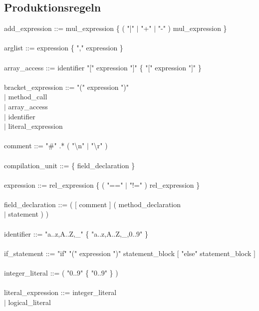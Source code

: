 \documentclass[10pt,a4paper,titlepage]{article}
\begin{document}
\subsection{Produktionsregeln}
\begin{ttfamily}
add\_expression ::= mul\_expression  \{ ( "|" $\mid$ "+" $\mid$ "-" ) mul\_expression \} \\\\
arglist ::=  expression \{ "," expression \}\\\\
array\_access ::= identifier "$[$" expression "$]$" \{ "$[$" expression "$]$" \} \\\\
bracket\_expression ::= "(" expression ")" \\
\hspace*{4.5cm}$\mid$ method\_call \\
\hspace*{4.5cm}$\mid$ array\_access \\
\hspace*{4.5cm}$\mid$ identifier \\
\hspace*{4.5cm}$\mid$ literal\_expression \\\\
comment ::= "\#" .* ( "\textbackslash n" $\mid$ "\textbackslash r" ) \\\\
compilation\_unit ::= \{ field\_declaration \}\\\\
expression ::= rel\_expression \{ ( "==" $\mid$ "!=" ) rel\_expression \}\\\\
field\_declaration ::= ( $[$ comment $]$ ( method\_declaration \\
\hspace*{7cm}$\mid$ statement ) )\\\\
identifier ::= "a..z,A..Z,\_" \{ "a..z,A..Z,\_,0..9" \}\\\\
if\_statement ::= "if" "(" expression ")" statement\_block $[$ "else" statement\_block $]$\\\\
integer\_literal ::= ( "0..9" \{ "0..9" \} )\\\\
literal\_expression ::= integer\_literal\\
\hspace*{4.5cm}$\mid$ logical\_literal \\\\

\end{ttfamily}
\end{document}
